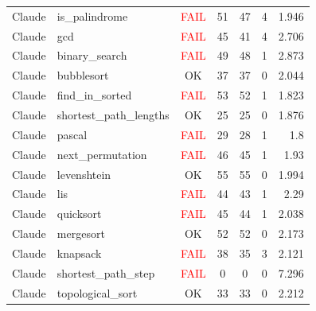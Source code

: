 \begin{longtable}{l l c c c c r}
  Claude & is\_palindrome & \textcolor{red}{FAIL} & 51 & 47 & 4 & 1.946 \\
  Claude & gcd & \textcolor{red}{FAIL} & 45 & 41 & 4 & 2.706 \\
  Claude & binary\_search & \textcolor{red}{FAIL} & 49 & 48 & 1 & 2.873 \\
  Claude & bubblesort & \textcolor{green!60!black}{OK} & 37 & 37 & 0 & 2.044 \\
  Claude & find\_in\_sorted & \textcolor{red}{FAIL} & 53 & 52 & 1 & 1.823 \\
  Claude & shortest\_path\_lengths & \textcolor{green!60!black}{OK} & 25 & 25 & 0 & 1.876 \\
  Claude & pascal & \textcolor{red}{FAIL} & 29 & 28 & 1 & 1.8 \\
  Claude & next\_permutation & \textcolor{red}{FAIL} & 46 & 45 & 1 & 1.93 \\
  Claude & levenshtein & \textcolor{green!60!black}{OK} & 55 & 55 & 0 & 1.994 \\
  Claude & lis & \textcolor{red}{FAIL} & 44 & 43 & 1 & 2.29 \\
  Claude & quicksort & \textcolor{red}{FAIL} & 45 & 44 & 1 & 2.038 \\
  Claude & mergesort & \textcolor{green!60!black}{OK} & 52 & 52 & 0 & 2.173 \\
  Claude & knapsack & \textcolor{red}{FAIL} & 38 & 35 & 3 & 2.121 \\
  Claude & shortest\_path\_step & \textcolor{red}{FAIL} & 0 & 0 & 0 & 7.296 \\
  Claude & topological\_sort & \textcolor{green!60!black}{OK} & 33 & 33 & 0 & 2.212 \\
\end{longtable}